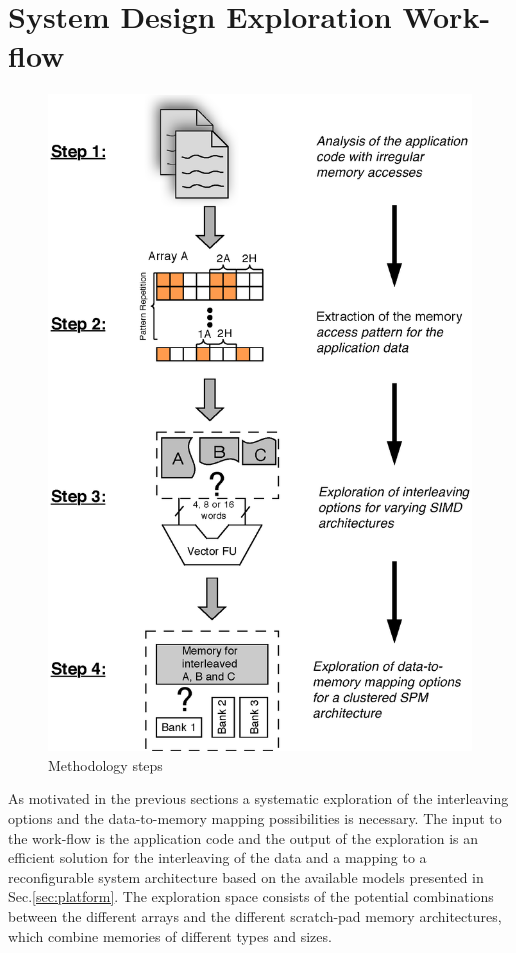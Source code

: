 \documentclass[prodmode,acmtecs]{acmsmall}
\begin{document}
\section{System Design Exploration Work-flow}
\label{sec:methodology}

\begin{figure}
\centering
	\includegraphics[scale = 0.6]{Images/workflow2.eps} 
	\caption{Methodology steps}
	\label{fig:workflow}
\end{figure}

As motivated in the previous sections a systematic exploration of the interleaving options and the data-to-memory mapping possibilities is necessary.
The input to the work-flow is the application code and the output of the exploration is an efficient solution for the interleaving of the data and a mapping to a reconfigurable system architecture based on the available models presented in Sec.\ref{sec:platform}.
The exploration space consists of the potential combinations between the different arrays and the different scratch-pad memory architectures, which combine memories of different types and sizes.
\end{document}

